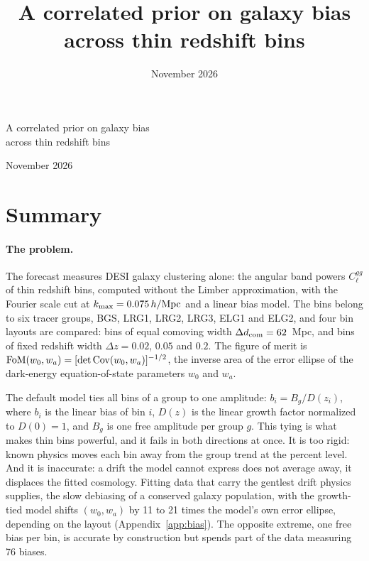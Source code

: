 \documentclass[11pt]{article}
\title{A correlated prior on galaxy bias across thin redshift bins}
\date{November 2026}
\author{}
\begin{document}
\begin{center}
  {\LARGE A correlated prior on galaxy bias\\[0.3em] across thin redshift bins\par}
  \vspace{1em}
  {\large November 2026\par}
\end{center}
\vspace{1em}

\section{Summary}
\label{sec:summary}

\paragraph{The problem.}
The forecast measures DESI galaxy clustering alone: the angular band
powers $C_\ell^{gg}$ of thin redshift bins, computed without the
Limber approximation, with the Fourier scale cut at
$k_{\rm max} = 0.075\,h/{\rm Mpc}$ and a linear bias model.  The bins
belong to six tracer groups, BGS, LRG1, LRG2, LRG3, ELG1 and ELG2,
and four bin layouts are compared: bins of equal comoving width
$\Delta d_{\rm com} = 62$~Mpc, and bins of fixed redshift width
$\Delta z = 0.02$, $0.05$ and $0.2$.  The figure of merit is
${\rm FoM}(w_0, w_a) = [\det \mathrm{Cov}(w_0, w_a)]^{-1/2}$, the
inverse area of the error ellipse of the dark-energy equation-of-state
parameters $w_0$ and $w_a$.

The default model ties all bins of a group to one amplitude:
$b_i = B_g / D(z_i)$, where $b_i$ is the linear bias of bin $i$,
$D(z)$ is the linear growth factor normalized to $D(0) = 1$, and
$B_g$ is one free amplitude per group $g$.  This tying is what makes
thin bins powerful, and it fails in both directions at once.  It is
too rigid: known physics moves each bin away from the group trend at
the percent level.  And it is inaccurate: a drift the model cannot
express does not average away, it displaces the fitted cosmology.
Fitting data that carry the gentlest drift physics supplies, the slow
debiasing of a conserved galaxy population, with the growth-tied
model shifts $(w_0, w_a)$ by 11 to 21 times the model's own error ellipse,
depending on the layout (Appendix~\ref{app:bias}).  The opposite
extreme, one free bias per bin, is accurate by construction but
spends part of the data measuring 76 biases.
\end{document}
